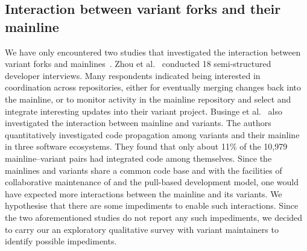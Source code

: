 \subsection{Interaction between variant forks and their mainline}
We have only encountered two studies that investigated the interaction between variant forks and mainlines~\cite{Zhou:2020,businge:emse:2021}.
Zhou et al.~\cite{Zhou:2020} conducted 18 semi-structured developer interviews. Many respondents indicated being interested in coordination across repositories, either for eventually merging changes back into the mainline, or to monitor activity in the mainline repository and select and integrate interesting updates into their variant project.
Businge et al.~\cite{businge:emse:2021} also  investigated the interaction between mainline and variants. The authors quantitatively investigated code propagation among variants and their mainline in three software ecosystems. They found that only about 11\% of the 10,979 mainline--variant pairs had integrated code among themselves. 
Since the mainlines and variants share a common code base and with the facilities of collaborative maintenance of \git and the pull-based development model, 
one would have expected more interactions between the mainline and its variants. We hypothesise that there are some impediments to enable such interactions. 
Since the two aforementioned studies do not report any such impediments,
we decided to carry our an exploratory qualitative survey with variant maintainers to identify possible impediments.


